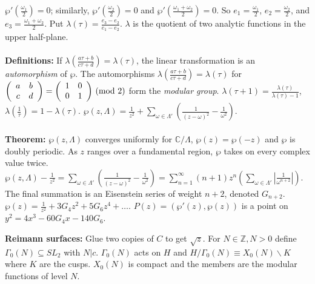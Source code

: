 $ \wp'({\frac {\omega_1} {2}})= 0 $; similarly,
$ \wp'({\frac {\omega_2} {2}})= 0 $ and
$ \wp'({\frac {\omega_1+\omega_2} {2}})= 0 $. So
$e_1=  {\frac {\omega_1} {2}}$,
$e_2= {\frac {\omega_2} {2}}$, and
$e_3= {\frac {\omega_1+\omega_2} {2}}$.  Put $\lambda( \tau )= {\frac {e_3 - e_2} {e_1- e_2}}$.
$\lambda$ is the quotient of two analytic functions in the upper half-plane.
\\
\\
{\bf Definitions:}
If $\lambda({\frac {a \tau + b} {c \tau + d}})= \lambda(\tau)$, the linear transformation is
an \emph{automorphism} of $\wp$.  The automorphisms
$\lambda({\frac {a \tau + b} {c \tau + d}})= \lambda(\tau)$ for
$
\left(
\begin{array}{cc}
a & b\\
c & d\\
\end{array}
\right)=
\left(
\begin{array}{cc}
1 & 0\\
0 & 1\\
\end{array}
\right) \thinspace \textnormal{(mod } 2 \textnormal{)}
$ form the \emph{modular group}.
$\lambda(\tau + 1) = {\frac {\lambda(\tau)} {\lambda(\tau) -1}}$,
$\lambda({\frac 1 \tau}) = 1- \lambda(\tau)$.
$\wp(z, \Lambda)= {\frac 1 {z^2}}+ \sum_{\omega \in \Lambda'} ({\frac 1 {(z-\omega)^2}} - 
{\frac 1 {\omega^2}})$.
\\
\\
{\bf Theorem:}  
$\wp(z, \Lambda)$ converges uniformly for ${\mathbb C}/\Lambda$, $\wp(z)= \wp(-z)$ and
$\wp$ is doubly periodic.  As $z$ ranges over a fundamental region, $\wp$ takes on every
complex value twice.
$\wp(z, \Lambda)- {\frac 1 {z^2}}= 
\sum_{\omega \in \Lambda'} ({\frac 1 {(z-\omega)^2}} - {\frac 1 {\omega^2}})=
\sum_{n=1}^{\infty} (n+1) z^n
(\sum_{\omega \in \Lambda'} 
|{\frac 1 {\omega^{n+2}}}|)$. The final summation is an Eisenstein series of weight
$n+2$, denoted $G_{n+2}$.
$\wp(z)= {\frac 1 {z^2}} +3G_4 z^2+ 5G_6z^4 + \ldots$.
$P(z)= (\wp'(z), \wp(z))$ is a point on $y^2=4x^3-60 G_4 x -140 G_6$.
\begin{quote}
\end{quote}
{\bf Reimann surfaces:}
Glue two copies of $C$ to get ${\sqrt z}$.  For $N \in {\mathbb Z}, N>0$ define
$\Gamma_0 (N) \subseteq SL_2$ with $N|c$.
$\Gamma_0 (N)$ acts on $H$ and $H/
\Gamma_0 (N) \equiv X_0 (N) \backslash K$ where $K$ are the cusps.  
$X_0 (N)$ is compact and
the members are the modular functions of level $N$.
\\
\\
